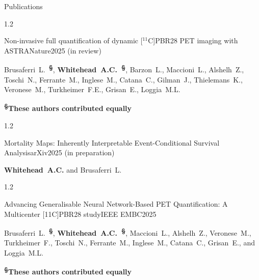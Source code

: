 \documentclass{cv}
\begin{document}
    \begin{rSection}{Publications}
        \vspace{-0.5cm}
        \begin{spacing}{1.2}
            \item \begin{rSubsection}{Non-invasive full quantification of dynamic [$^{11}$C]PBR28 PET imaging with ASTRA}{}{Nature}{2025 (in review)}
                \vspace{-0.25cm}
                \item  Brusaferri~L.~\textbf{\textsuperscript{\S}}, \textbf{Whitehead~A.C.~\textsuperscript{\S}}, Barzon~L., Maccioni~L., Alshelh~Z., Toschi~N., Ferrante~M., Inglese~M., Catana~C., Gilman~J., Thielemans~K., Veronese~M., Turkheimer~F.E., Grisan~E., Loggia~M.L. \\
                \vspace{-0.5cm}
                \item \textbf{\textsuperscript{\S}These authors contributed equally} \\
            \end{rSubsection}
        \end{spacing}

        \vspace{-0.5cm}
        \begin{spacing}{1.2}
            \item \begin{rSubsection}{Mortality Maps: Inherently Interpretable Event-Conditional Survival Analysis}{}{arXiv}{2025 (in preparation)}
                \vspace{-0.25cm}
                \item \textbf{Whitehead~A.C.} and Brusaferri~L. \\
            \end{rSubsection}
        \end{spacing}

        \vspace{-0.5cm}
        \begin{spacing}{1.2}
            \item \begin{rSubsection}{Advancing Generalisable Neural Network-Based PET Quantification: A Multicenter [11C]PBR28 study}{}{IEEE EMBC}{2025}
                \vspace{-0.25cm}
                \item Brusaferri~L.~\textbf{\textsuperscript{\S}}, \textbf{Whitehead~A.C.~\textsuperscript{\S}}, Maccioni~L., Alshelh~Z., Veronese~M., Turkheimer~F., Toschi~N., Ferrante~M., Inglese~M., Catana~C., Grisan~E., and Loggia~M.L. \\
                \vspace{-0.5cm}
                \item \textbf{\textsuperscript{\S}These authors contributed equally} \\
            \end{rSubsection}
        \end{spacing}


\end{rSection}
\end{document}
